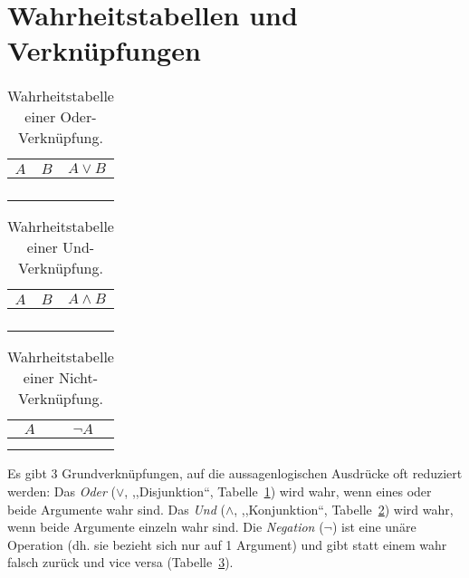 \section{Wahrheitstabellen und Verknüpfungen}
%
\begin{table}[p]
 \begin{center}
  \begin{tabular}{cc|c}
   \hline
    $A$ & $B$ & $A \lor B$ \\
   \hline \hline
    \F  & \F  & \F \\
    \F  & \T  & \T \\
    \T  & \F  & \T \\
    \T  & \T  & \T \\
  \end{tabular}
  \caption{Wahrheitstabelle einer Oder-Verknüpfung.}
  \label{fig:or_operator}
 \end{center}
\end{table}
\begin{table}[p]
 \begin{center}
  \begin{tabular}{cc|c}
   \hline
    $A$ & $B$ & $A \land B$ \\
   \hline \hline
    \F  & \F  & \F \\
    \F  & \T  & \F \\
    \T  & \F  & \F \\
    \T  & \T  & \T \\
  \end{tabular}
  \caption{Wahrheitstabelle einer Und-Verknüpfung.}
  \label{fig:and_operator}
 \end{center}
\end{table}
\begin{table}[p]
 \begin{center}
  \begin{tabular}{c|c}
   \hline
    $A$ & $\neg A$ \\
   \hline \hline
    \F   & \T \\
    \T   & \F \\
  \end{tabular}
  \caption{Wahrheitstabelle einer Nicht-Verknüpfung.}
  \label{fig:neg_operator}
 \end{center}
\end{table}
%
Es gibt 3 Grundverknüpfungen, auf die aussagenlogischen Ausdrücke oft reduziert werden: Das \emph{Oder} ($\lor$, ,,Disjunktion``, Tabelle~\ref{fig:or_operator}) wird wahr, wenn eines oder beide Argumente wahr sind. Das \emph{Und} ($\land$, ,,Konjunktion``, Tabelle~\ref{fig:and_operator}) wird wahr, wenn beide Argumente einzeln wahr sind. Die \emph{Negation} ($\neg$) ist eine unäre Operation (dh. sie bezieht sich nur auf 1 Argument) und gibt statt einem wahr falsch zurück und vice versa (Tabelle~\ref{fig:neg_operator}).


